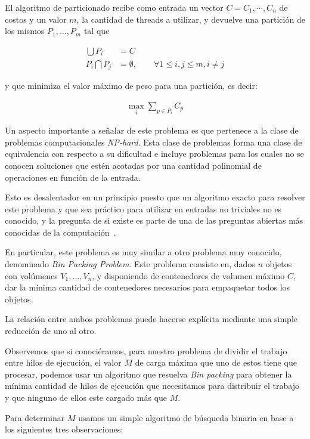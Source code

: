 El algoritmo de particionado recibe como entrada un vector $C = {C_1, \cdots, C_n}$
de costos y un valor $m$, la cantidad de threads a utilizar, y devuelve una
partici\'on de los mismos $P_1, \dots, P_m$ tal que

\begin{align}
    \bigcup P_i & = C \\
    P_i \bigcap P_j & = \emptyset, \qquad \forall 1 \leq i,j \leq m, i \neq j
    \label{eq:partition-conditions}
\end{align}

y que minimiza el valor m\'aximo de peso para una partici\'on, es decir:

\begin{align}
    \displaystyle \max_i \sum_{p \in P_i} C_p
\end{align}

Un aspecto importante a se\~nalar de este problema es que pertenece a la clase
de problemas computacionales \textit{NP-hard}. Esta clase de problemas forma una
clase de equivalencia con respecto a su dificultad e incluye problemas para los
cuales no se conocen soluciones que est\'en acotadas por una cantidad polinomial
de operaciones en funci\'on de la entrada.

Esto es desalentador en un principio puesto que un algoritmo exacto para resolver
este problema y que sea pr\'actico para utilizar en entradas no triviales no es
conocido, y la pregunta de si existe es parte de una de las preguntas abiertas
m\'as conocidas de la computaci\'on~\cite{Cormen}.

En particular, este problema es muy similar a otro problema muy conocido,
denominado \textit{Bin Packing Problem}. Este problema consiste en, dados $n$
objetos con vol\'umenes $V_1, \dots, V_n$, y disponiendo de contenedores de
volumen m\'aximo $C$, dar la m\'inima cantidad de contenedores necesarios para
empaquetar todos los objetos.

La relaci\'on entre ambos problemas puede hacerse expl\'icita mediante una simple
reducci\'on de uno al otro.

Observemos que si conoci\'eramos, para nuestro problema de dividir el trabajo entre
hilos de ejecuci\'on, el valor $M$ de carga m\'axima que uno de estos tiene que
procesar, podemos usar un algoritmo que resuelva \textit{Bin packing} para
obtener la m\'inima cantidad de hilos de ejecuci\'on que necesitamos para distribuir
el trabajo y que ninguno de ellos este cargado m\'as que $M$.

Para determinar $M$ usamos un simple algoritmo de b\'usqueda binaria en base a los
siguientes tres observaciones:


